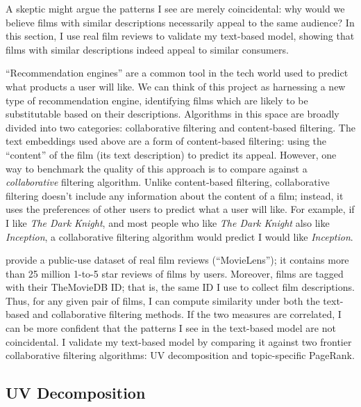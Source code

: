 \documentclass{article}
\begin{document}
A skeptic might argue the patterns I see are merely coincidental: why would we believe films with similar descriptions necessarily appeal to the same audience? In this section, I use real film reviews to validate my text-based model, showing that films with similar descriptions indeed appeal to similar consumers.

``Recommendation engines'' are a common tool in the tech world used to predict what products a user will like. We can think of this project as harnessing a new type of recommendation engine, identifying films which are likely to be substitutable based on their descriptions. Algorithms in this space are broadly divided into two categories: collaborative filtering and content-based filtering. The text embeddings used above are a form of content-based filtering: using the ``content'' of the film (its text description) to predict its appeal. However, one way to benchmark the quality of this approach is to compare against a \emph{collaborative} filtering algorithm. Unlike content-based filtering, collaborative filtering doesn't include any information about the content of a film; instead, it uses the preferences of other users to predict what a user will like. For example, if I like \emph{The Dark Knight}, and most people who like \emph{The Dark Knight} also like \emph{Inception}, a collaborative filtering algorithm would predict I would like \emph{Inception}. 

\textcite{harper2016ATIIS} provide a public-use dataset of real film reviews (``MovieLens''); it contains more than 25 million 1-to-5 star reviews of films by users. Moreover, films are tagged with their TheMovieDB ID; that is, the same ID I use to collect film descriptions. Thus, for any given pair of films, I can compute similarity under both the text-based and collaborative filtering methods. If the two measures are correlated, I can be more confident that the patterns I see in the text-based model are not coincidental. I validate my text-based model by comparing it against two frontier collaborative filtering algorithms: UV decomposition and topic-specific PageRank.

\subsection{UV Decomposition}
\end{document}
